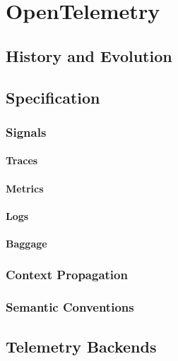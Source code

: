 \chapter{OpenTelemetry}
\label{chap:opentelemetry}

\section{History and Evolution}
\label{sec:o_history_and_evolution}

\section{Specification}
\label{sec:o_specification}

\subsection{Signals}
\subsubsection{Traces}
\subsubsection{Metrics}
\subsubsection{Logs}
\subsubsection{Baggage}
\subsection{Context Propagation}
\subsection{Semantic Conventions}

\section{Telemetry Backends}
\label{sec:o_telemetry_backends}